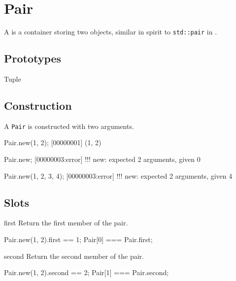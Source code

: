 
\section{Pair}

A  is a container storing two objects, similar in spirit to
\lstinline|std::pair| in \Cxx.

\subsection{Prototypes}
\begin{refObjects}
\item[Tuple]
\end{refObjects}

\subsection{Construction}

A \lstinline|Pair| is constructed with two arguments.

\begin{urbiscript}[firstnumber=1]
Pair.new(1, 2);
[00000001] (1, 2)

Pair.new;
[00000003:error] !!! new: expected 2 arguments, given 0

Pair.new(1, 2, 3, 4);
[00000003:error] !!! new: expected 2 arguments, given 4
\end{urbiscript}

\subsection{Slots}
\begin{urbiscriptapi}
\item[first]
  Return the first member of the pair.
\begin{urbiassert}
Pair.new(1, 2).first == 1;
Pair[0] === Pair.first;
\end{urbiassert}


\item[second]
  Return the second member of the pair.
\begin{urbiassert}
Pair.new(1, 2).second == 2;
Pair[1] === Pair.second;
\end{urbiassert}
\end{urbiscriptapi}



